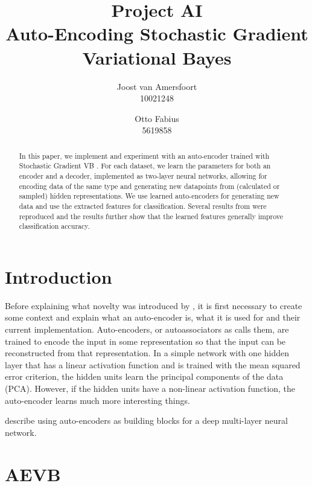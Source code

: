 \documentclass{article}
\begin{document}
\title{Project AI \\ Auto-Encoding Stochastic Gradient Variational Bayes}
\author{	
	Joost van Amersfoort \\ 10021248  
	\and
	Otto Fabius \\ 5619858
	}
\maketitle

\begin{abstract}
In this paper, we implement and experiment with an auto-encoder trained with Stochastic Gradient VB \cite{kingma2013auto}. For each dataset, we learn the parameters for both an encoder and a decoder, implemented as two-layer neural networks, allowing for encoding data of the same type and generating new datapoints from (calculated or sampled) hidden representations. We use learned auto-encoders for generating new data and use the extracted features for classification. Several results from \cite{kingma2013auto} were reproduced and the results further show that the learned features generally improve classification accuracy.
\end{abstract}

\section{Introduction}

Before explaining what novelty was introduced by \cite{kingma2013auto}, it is first necessary to create some context and explain what an auto-encoder is, what it is used for and their current implementation. Auto-encoders, or autoassociators as \cite{bengio2009learning} calls them, are trained to encode the input in some representation so that the input can be reconstructed from that representation. In a simple network with one hidden layer that has a linear activation function and is trained with the mean squared error criterion, the hidden units learn the principal components of the data (PCA). However, if the hidden units have a non-linear activation function, the auto-encoder learns much more interesting things.

\cite{bengio2009learning} describe using auto-encoders as building blocks for a deep multi-layer neural network. 

\section{AEVB}
\end{document}
